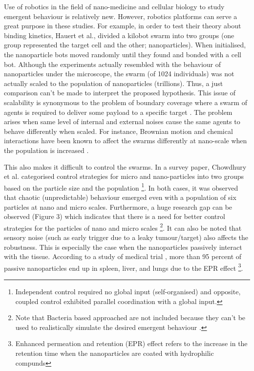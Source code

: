 \documentclass[11pt,a4paper]{article}
\begin{document}
\begin{multicols}{2}
Use of robotics in the field of nano-medicine and cellular biology to study emergent behaviour is relatively new. However, robotics platforms can serve a great purpose in these studies. For example, in order to test their theory about binding kinetics, Hauert et al., \cite{hauertinsights} divided a kilobot swarm\cite{rubenstein2012kilobot} into two groups (one group represented the target cell and the other; nanoparticles). When initialised, the nanoparticle bots moved randomly until they found and bonded with a cell bot. Although the experiments actually resembled with the behaviour of nanoparticles under the microscope, the swarm (of 1024 individuals) was not actually scaled to the population of nanoparticles (trillions). Thus, a just comparison can't be made to interpret the proposed hypothesis. This issue of scalability is synonymous to the problem of boundary coverage where a swarm of agents is required to deliver some payload to a specific target \cite{williams2006multi}. The problem arises when same level of internal and external noises cause the same agents to behave differently when scaled. For instance, Brownian motion and chemical interactions have been known to affect the swarms differently at nano-scale when the population is increased \cite{jang2004role}.

This also makes it difficult to control the swarms. In a survey paper, Chowdhury et al. \cite{chowdhury2015controlling} categorised control strategies for micro and nano-particles into two groups based on the particle size and the population \footnote{Independent control required no global input (self-organised) and opposite, coupled control exhibited parallel coordination with a global input.}. In both cases, it was observed that chaotic (unpredictable) behaviour emerged even with a population of six particles at nano and micro scales. Furthermore, a huge research gap can be observed (Figure 3) which indicates that there is a need for better control strategies for the particles of nano and micro scales \footnote{Note that Bacteria based approached are not included because they can't be used to realistically simulate the desired emergent behaviour \cite{jain2008nanomedicine}.}. It can also be noted that sensory noise (such as early trigger due to a leaky tumour/target) also affects the robustness. This is especially the case when the nanoparticles passively interact with the tissue. According to a study of medical trial \cite{bae2011targeted}, more than 95 percent of passive nanoparticles end up in spleen, liver, and lungs due to the EPR effect \footnote{Enhanced permeation and retention (EPR) effect refers to the increase in the retention time when the nanoparticles are coated with hydrophilic compunds}. 


\end{multicols}
\end{document}
